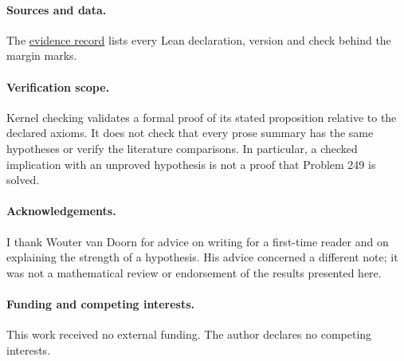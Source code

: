 \documentclass[11pt]{article}
\theoremstyle{plain}
\theoremstyle{definition}
\theoremstyle{remark}
\begin{document}
\paragraph{Sources and data.} The \href{\evidencerecordurl}{evidence record}
lists every Lean declaration, version and check behind the margin marks.

\paragraph{Verification scope.} Kernel checking validates a formal proof of
its stated proposition relative to the declared axioms. It does not check
that every prose summary has the same hypotheses or verify the literature
comparisons. In particular, a checked implication with an unproved
hypothesis is not a proof that Problem 249 is solved.

\paragraph*{Acknowledgements.} I thank Wouter van Doorn for advice on
writing for a first-time reader and on explaining the strength of a
hypothesis. His advice concerned a different note; it was not a
mathematical review or endorsement of the results presented here.

\paragraph{Funding and competing interests.} This work received no external
funding. The author declares no competing interests.
\end{document}
